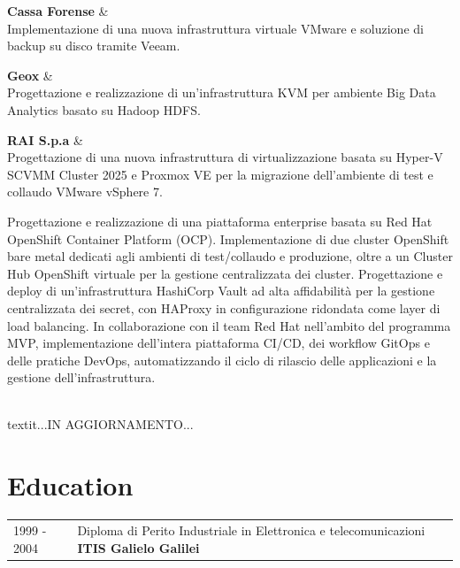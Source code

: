 \documentclass[a4paper,12pt]{article}
\begin{document}
\textbf{Cassa Forense} & \\

Implementazione di una nuova infrastruttura virtuale VMware e soluzione di backup su disco tramite Veeam.

\vspace{6pt}

\textbf{Geox} & \\

Progettazione e realizzazione di un'infrastruttura KVM per ambiente Big Data Analytics basato su Hadoop HDFS.

\vspace{6pt}

\textbf{RAI S.p.a} & \\

Progettazione di una nuova infrastruttura di virtualizzazione basata su Hyper-V SCVMM Cluster 2025 e Proxmox VE per la migrazione dell'ambiente di test e collaudo VMware vSphere 7.

\vspace{6pt}

Progettazione e realizzazione di una piattaforma enterprise basata su Red Hat OpenShift Container Platform (OCP). Implementazione di due cluster OpenShift bare metal dedicati agli ambienti di test/collaudo e produzione, oltre a un Cluster Hub OpenShift virtuale per la gestione centralizzata dei cluster. Progettazione e deploy di un'infrastruttura HashiCorp Vault ad alta affidabilità per la gestione centralizzata dei secret, con HAProxy in configurazione ridondata come layer di load balancing. In collaborazione con il team Red Hat nell'ambito del programma MVP, implementazione dell'intera piattaforma CI/CD, dei workflow GitOps e delle pratiche DevOps, automatizzando il ciclo di rilascio delle applicazioni e la gestione dell'infrastruttura.

\vspace{6pt}

\begin{center}
    \\textit{...IN AGGIORNAMENTO...}
\end{center}


\section{Education}
\begin{tabularx}{\linewidth}{@{}l X@{}}	

1999 - 2004 & Diploma di Perito Industriale in Elettronica e telecomunicazioni \textbf{ITIS Galielo Galilei} \\ 

\end{tabularx}
\end{document}
